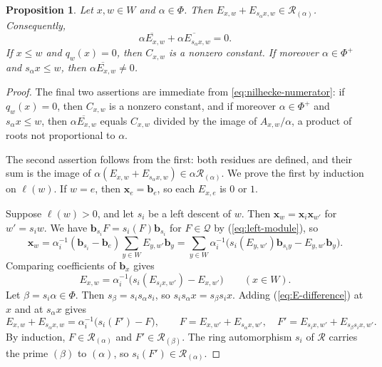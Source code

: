 \documentclass[11pt]{amsart}
\newtheorem{proposition}[proposition]{Proposition}
\theoremstyle{definition}
\theoremstyle{remark}
\numberwithin{equation}{section}
\begin{document}
\begin{proposition}\label{prop:residue}
Let $x,w\in W$ and $\alpha\in\Phi$. Then
$E_{x,w}+E_{s_\alpha x,w}\in\mathcal{R}_{(\alpha)}$. Consequently,
\[
 \overline{\alpha E_{x,w}}+
 \overline{\alpha E_{s_\alpha x,w}}=0.
\]
If $x\le w$ and $q_w(x)=0$, then $C_{x,w}$ is a nonzero constant. If
moreover $\alpha\in\Phi^+$ and $s_\alpha x\le w$, then
$\overline{\alpha E_{x,w}}\ne0$.
\end{proposition}
\begin{proof}
The final two assertions are immediate from
\eqref{eq:nilhecke-numerator}: if $q_w(x)=0$, then $C_{x,w}$ is a
nonzero constant, and if moreover $\alpha\in\Phi^+$ and
$s_\alpha x\le w$, then $\overline{\alpha E_{x,w}}$ equals $C_{x,w}$
divided by the image of $A_{x,w}/\alpha$, a product of roots not
proportional to $\alpha$.

The second assertion follows from the first: both residues are
defined, and their sum is the image of
$\alpha(E_{x,w}+E_{s_\alpha x,w})\in\alpha\mathcal{R}_{(\alpha)}$.
We prove the first by induction on $\ell(w)$. If $w=e$, then
$\mathbf{x}_e=\mathbf{b}_e$, so each $E_{x,e}$ is $0$ or $1$.

Suppose $\ell(w)>0$, and let $s_i$ be a left descent of $w$. Then
$\mathbf{x}_w=\mathbf{x}_i\mathbf{x}_{w'}$ for $w'=s_iw$. We have $\mathbf{b}_{s_i}F=s_i(F)\mathbf{b}_{s_i}$ for
$F\in\mathcal{Q}$ by (\ref{eq:left-module}), so
\[
 \mathbf{x}_w
 =\alpha_i^{-1}(\mathbf{b}_{s_i}-\mathbf{b}_e)\sum_{y\in W}E_{y,w'}\mathbf{b}_y
 =\sum_{y\in W}\alpha_i^{-1}\bigl(s_i(E_{y,w'})\mathbf{b}_{s_iy}-E_{y,w'}\mathbf{b}_y\bigr).
\]
Comparing coefficients of $\mathbf{b}_x$ gives
\begin{equation}
    \label{eq:E-difference}
 E_{x,w}=\alpha_i^{-1}\bigl(s_i(E_{s_ix,w'})-E_{x,w'}\bigr)
 \qquad(x\in W).
\end{equation}
Let $\beta=s_i\alpha\in\Phi$. Then $s_\beta=s_is_\alpha s_i$, so
$s_is_\alpha x=s_\beta s_ix$. Adding (\ref{eq:E-difference}) at $x$ and
at $s_\alpha x$ gives
\[
 E_{x,w}+E_{s_\alpha x,w}=\alpha_i^{-1}\bigl(s_i(F')-F\bigr),
 \qquad
 F=E_{x,w'}+E_{s_\alpha x,w'},\quad
 F'=E_{s_ix,w'}+E_{s_\beta s_ix,w'}.
\]
By induction, $F\in\mathcal{R}_{(\alpha)}$ and
$F'\in\mathcal{R}_{(\beta)}$. The ring automorphism $s_i$ of
$\mathcal{R}$ carries the prime $(\beta)$ to $(\alpha)$, so
$s_i(F')\in\mathcal{R}_{(\alpha)}$.


\end{proof}
\end{document}
